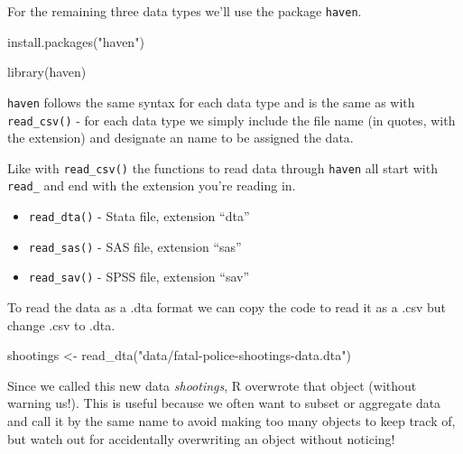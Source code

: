 \documentclass[
]{krantz}
\makeatletter
\newenvironment{Shaded}{\begin{snugshade}}{\end{snugshade}}
\newcommand{\FunctionTok}[1]{\textcolor[rgb]{0,0,0}{#1}}
\newcommand{\NormalTok}[1]{#1}
\newcommand{\OtherTok}[1]{\textcolor[rgb]{0.37,0.37,0.37}{#1}}
\newcommand{\StringTok}[1]{\textcolor[rgb]{0.5,0.5,0.5}{#1}}
\providecommand{\tightlist}{%
  \setlength{\itemsep}{0pt}\setlength{\parskip}{0pt}}
\newenvironment{kframe}{%
\medskip{}
\setlength{\fboxsep}{.8em}
 \def\at@end@of@kframe{}%
 \ifinner\ifhmode%
  \def\at@end@of@kframe{\end{minipage}}%
  \begin{minipage}{\columnwidth}%
 \fi\fi%
 \def\FrameCommand##1{\hskip\@totalleftmargin \hskip-\fboxsep
 \colorbox{shadecolor}{##1}\hskip-\fboxsep
     \hskip-\linewidth \hskip-\@totalleftmargin \hskip\columnwidth}%
 \MakeFramed {\advance\hsize-\width
   \@totalleftmargin\z@ \linewidth\hsize
   \@setminipage}}%
 {\par\unskip\endMakeFramed%
 \at@end@of@kframe}
\renewenvironment{Shaded}{\begin{kframe}}{\end{kframe}}
\makeatother
\begin{document}
For the remaining three data types we'll use the package \texttt{haven}.

\begin{Shaded}
\begin{Highlighting}[]
\FunctionTok{install.packages}\NormalTok{(}\StringTok{"haven"}\NormalTok{)}
\end{Highlighting}
\end{Shaded}

\begin{Shaded}
\begin{Highlighting}[]
\FunctionTok{library}\NormalTok{(haven)}
\end{Highlighting}
\end{Shaded}

\texttt{haven} follows the same syntax for each data type and is the same as with \texttt{read\_csv()} - for each data type we simply include the file name (in quotes, with the extension) and designate an name to be assigned the data.

Like with \texttt{read\_csv()} the functions to read data through \texttt{haven} all start with \texttt{read\_} and end with the extension you're reading in.

\begin{itemize}
\tightlist
\item
  \texttt{read\_dta()} - Stata file, extension ``dta''
\item
  \texttt{read\_sas()} - SAS file, extension ``sas''
\item
  \texttt{read\_sav()} - SPSS file, extension ``sav''
\end{itemize}

To read the data as a .dta format we can copy the code to read it as a .csv but change .csv to .dta.

\begin{Shaded}
\begin{Highlighting}[]
\NormalTok{shootings }\OtherTok{\textless{}{-}} \FunctionTok{read\_dta}\NormalTok{(}\StringTok{"data/fatal{-}police{-}shootings{-}data.dta"}\NormalTok{)}
\end{Highlighting}
\end{Shaded}

Since we called this new data \emph{shootings}, R overwrote that object (without warning us!). This is useful because we often want to subset or aggregate data and call it by the same name to avoid making too many objects to keep track of, but watch out for accidentally overwriting an object without noticing!
\end{document}
